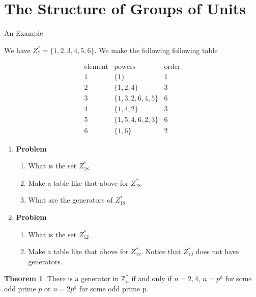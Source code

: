 \documentclass[12pt]{amsart}
\newcommand{\benu}{\begin{enumerate}}
\newcommand{\eenu}{\end{enumerate}}
\theoremstyle{definition}
\newtheorem{theorem}{Theorem}
\newcommand{\bet}{\begin{theorem}}
\newcommand{\et}{\end{theorem}}
\newcommand{\mbZ}{\mathbb{Z}}
\newcommand{\itep}{\item {\bfseries Problem}\ }
\begin{document}
\section{The Structure of Groups of Units}

\begin{center}An Example \end{center}
We have $Z_7^\ast=\{1,2,3,4,5,6\}$. We make the following following table

\begin{comment}
\begin{align*}
\text{element} & \text{powers} & \text{order}\\
\hline
1 &\{1\} & 1\\
\hline
2 & \{1,2,4\}& 3\\
\hline
3 &\{1,3,2,6,4,5\}& 6\\
\hline
4 &\{1,4,2\} & 3\\
\hline
5 & \{1,5,4,6,2,3\} & 6\\
\hline
6 & \{1,6\} & 2
\end{align*}
\end{comment}
\begin{equation*}
\begin{array}{c|c|c}
\text{element} & \text{powers} & \text{order}
\\
\hline
1 &\{1\} & 1
\\
\hline
2 & \{1,2,4\}& 3
\\
\hline
3 &\{1,3,2,6,4,5\}& 6
\\
\hline
4 &\{1,4,2\} & 3
\\
\hline
5 & \{1,5,4,6,2,3\} & 6
\\
\hline
6 & \{1,6\} & 2
\end{array}
\end{equation*}


\begin{enumerate}[resume=p]
\itep
\benu
\item What is the set $Z_{18}^*$
\item Make a table like that above for $Z_{18}^*$
\item What are the generators of $Z_{18}^*$
\eenu
\itep
\benu
\item What is the set $Z_{12}^*$
\item Make a table like that above for $Z_{12}^*$. Notice that $Z_{12}^*$ does not have generators.
\eenu
\end{enumerate}
\bet There is a generator in $\mbZ_n^*$ if and only if $n=2,4$, $n=p^k$ for some odd prime $p$ or $n=2p^k$ for some odd prime p.
\et
\end{document}
